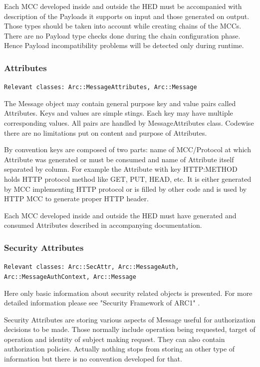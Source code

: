\documentclass{book}
\begin{document}
Each MCC developed inside and outside the HED must be accompanied with description of the Payloads it supports on input and those generated on output. Those types should be taken into account while creating chains of the MCCs. There are no Payload type checks done during the chain configuration phase. Hence Payload incompatibility problems will be detected only during runtime.

\subsubsection{Attributes}

\texttt{Relevant classes: Arc::MessageAttributes, Arc::Message}

The Message object may contain general purpose key and value pairs called Attributes. Keys and values are simple stings. Each key may have multiple corresponding values. All pairs are handled by MessageAttributes class. Codewise there are no limitations put on content and purpose of Attributes.

By convention keys are composed of two parts: name of MCC/Protocol at which Attribute was generated or must be consumed and name of Attribute itself separated by column. For example the Attribute with key HTTP:METHOD holds HTTP protocol method like GET, PUT, HEAD, etc. It is either generated by MCC implementing HTTP protocol or is filled by other code and is used by HTTP MCC to generate proper HTTP header.

Each MCC developed inside and outside the HED must have generated and consumed Attributes described in accompanying documentation.


\subsubsection{Security Attributes}

\texttt{Relevant classes: Arc::SecAttr, Arc::MessageAuth, Arc::MessageAuthContext, Arc::Message}

Here only basic information about security related objects is presented. For more detailed information please see "Security Framework of ARC1" \cite{sec-arc1}.

Security Attributes are storing various aspects of Message useful for authorization decisions to be made. Those normally include operation being requested, target of operation and identity of subject making request. They can also contain authorization policies. Actually nothing stops from storing an other type of information but there is no convention developed for that.
\end{document}
